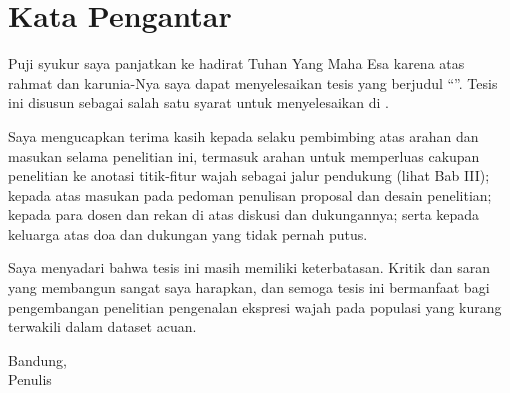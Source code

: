 \chapter*{Kata Pengantar}

Puji syukur saya panjatkan ke hadirat Tuhan Yang Maha Esa karena atas rahmat dan karunia-Nya saya dapat menyelesaikan tesis yang berjudul ``\ThesisTitleID''. Tesis ini disusun sebagai salah satu syarat untuk menyelesaikan \ThesisProgramID{} di \ThesisInstitution.

Saya mengucapkan terima kasih kepada \SupervisorOne{} selaku pembimbing atas arahan dan masukan selama penelitian ini, termasuk arahan untuk memperluas cakupan penelitian ke anotasi titik-fitur wajah sebagai jalur pendukung (lihat Bab III); kepada \ResearchDesignAdvisor{} atas masukan pada pedoman penulisan proposal dan desain penelitian; kepada para dosen dan rekan di \ThesisProgramID{} atas diskusi dan dukungannya; serta kepada keluarga atas doa dan dukungan yang tidak pernah putus.

Saya menyadari bahwa tesis ini masih memiliki keterbatasan. Kritik dan saran yang membangun sangat saya harapkan, dan semoga tesis ini bermanfaat bagi pengembangan penelitian pengenalan ekspresi wajah pada populasi yang kurang terwakili dalam dataset acuan.

\vspace{2\baselineskip}
Bandung, \ThesisMonthYear\\
Penulis

\vspace{2\baselineskip}
\ThesisAuthor
